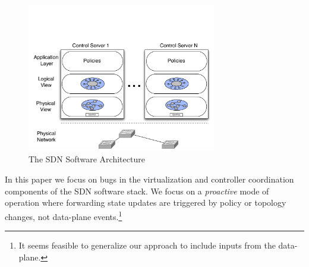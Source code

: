 
\begin{figure}[t]
    \includegraphics[width=3.25in]{../diagrams/architecture/SDN_Stack.pdf}
    \caption[]{\label{fig:basicarch} The SDN Software Architecture }
\end{figure}

In this paper we focus on bugs in the virtualization and controller coordination
components of the SDN software stack. We focus on a \emph{proactive} mode of
operation where forwarding state updates are triggered by policy or topology
changes, not data-plane events.\footnote{It seems feasible to generalize our
approach to include inputs from the data-plane.}
